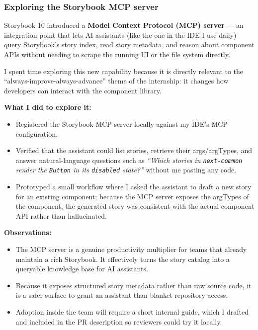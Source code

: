 \subsubsection{Exploring the Storybook MCP server}

Storybook 10 introduced a \textbf{Model Context Protocol (MCP) server} --- an integration point that lets AI assistants (like the one in the IDE I use daily) query Storybook's story index, read story metadata, and reason about component APIs without needing to scrape the running UI or the file system directly.

I spent time exploring this new capability because it is directly relevant to the ``always-improve-always-advance'' theme of the internship: it changes how developers can interact with the component library.

\textbf{What I did to explore it:}

\begin{itemize}
    \item Registered the Storybook MCP server locally against my IDE's MCP configuration.
    \item Verified that the assistant could list stories, retrieve their args/argTypes, and answer natural-language questions such as \emph{``Which stories in \texttt{next-common} render the \texttt{Button} in its \texttt{disabled} state?''} without me pasting any code.
    \item Prototyped a small workflow where I asked the assistant to draft a new story for an existing component; because the MCP server exposes the argTypes of the component, the generated story was consistent with the actual component API rather than hallucinated.
\end{itemize}

\textbf{Observations:}

\begin{itemize}
    \item The MCP server is a genuine productivity multiplier for teams that already maintain a rich Storybook. It effectively turns the story catalog into a queryable knowledge base for AI assistants.
    \item Because it exposes structured story metadata rather than raw source code, it is a safer surface to grant an assistant than blanket repository access.
    \item Adoption inside the team will require a short internal guide, which I drafted and included in the PR description so reviewers could try it locally.
\end{itemize}

